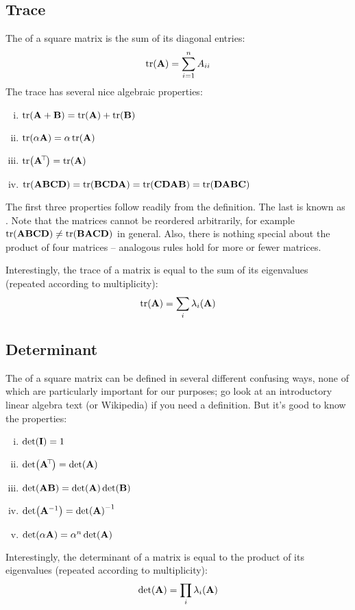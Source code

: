 \subsection{Trace}
The  of a square matrix is the sum of its diagonal entries:
\[\tr(\mathbf{A}) = \sum_{i=1}^n A_{ii}\]
The trace has several nice algebraic properties:
\begin{enumerate}[(i)]
\item $\tr(\mathbf{A}+\mathbf{B}) = \tr(\mathbf{A}) + \tr(\mathbf{B})$
\item $\tr(\alpha\mathbf{A}) = \alpha\tr(\mathbf{A})$
\item $\tr(\mathbf{A}^{\!\top\!}) = \tr(\mathbf{A})$
\item $\tr(\mathbf{A}\mathbf{B}\mathbf{C}\mathbf{D}) = \tr(\mathbf{B}\mathbf{C}\mathbf{D}\mathbf{A}) = \tr(\mathbf{C}\mathbf{D}\mathbf{A}\mathbf{B}) = \tr(\mathbf{D}\mathbf{A}\mathbf{B}\mathbf{C})$
\end{enumerate}
The first three properties follow readily from the definition.
The last is known as .
Note that the matrices cannot be reordered arbitrarily, for example $\tr(\mathbf{A}\mathbf{B}\mathbf{C}\mathbf{D}) \neq \tr(\mathbf{B}\mathbf{A}\mathbf{C}\mathbf{D})$ in general.
Also, there is nothing special about the product of four matrices -- analogous rules hold for more or fewer matrices.

Interestingly, the trace of a matrix is equal to the sum of its eigenvalues (repeated according to multiplicity):
\[\tr(\mathbf{A}) = \sum_i \lambda_i(\mathbf{A})\]

\subsection{Determinant}
The  of a square matrix can be defined in several different confusing ways, none of which are particularly important for our purposes; go look at an introductory linear algebra text (or Wikipedia) if you need a definition.
But it's good to know the properties:
\begin{enumerate}[(i)]
\item $\det(\mathbf{I}) = 1$
\item $\det(\mathbf{A}^{\!\top\!}) = \det(\mathbf{A})$
\item $\det(\mathbf{A}\mathbf{B}) = \det(\mathbf{A})\det(\mathbf{B})$
\item $\det(\mathbf{A}^{-1}) = \det(\mathbf{A})^{-1}$
\item $\det(\alpha\mathbf{A}) = \alpha^n \det(\mathbf{A})$
\end{enumerate}
Interestingly, the determinant of a matrix is equal to the product of its eigenvalues (repeated according to multiplicity):
\[\det(\mathbf{A}) = \prod_i \lambda_i(\mathbf{A})\]

